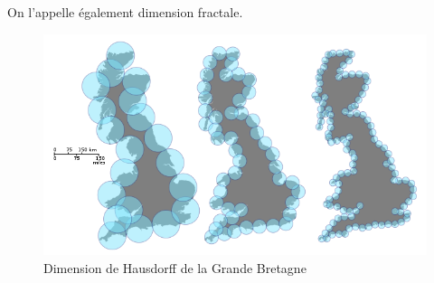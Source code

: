 On l'appelle également dimension fractale. 

\begin{figure}[H]
\centering
\includegraphics[scale=0.5]{images/hausdorff.png}
\caption{Dimension de Hausdorff de la Grande Bretagne }
\end{figure}


